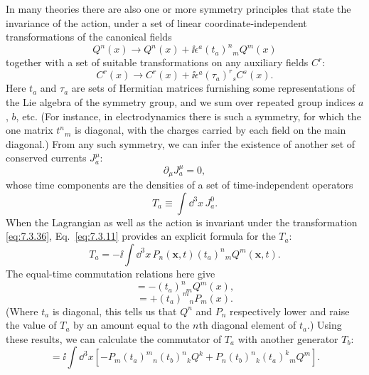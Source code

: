 In many theories there are also one or more symmetry principles that state the
invariance of the action, under a set of linear coordinate-independent
transformations of the canonical fields
\begin{equation}
Q^n(x)\longrightarrow Q^n(x)+\ii\epsilon^a(t_a)^n{}_mQ^m(x)
\tag{7.3.36}\label{eq:7.3.36}
\end{equation}
together with a set of suitable transformations on any auxiliary fields $C^r$:
\begin{equation}
C^r(x)\longrightarrow C^r(x)+\ii\epsilon^a(\tau_a)^r{}_sC^s(x).
\tag{7.3.37}\label{eq:7.3.37}
\end{equation}
Here $t_a$ and $\tau_a$ are sets of Hermitian matrices furnishing some
representations of the Lie algebra of the symmetry group, and we sum over
repeated group indices $a$, $b$, etc. (For instance, in electrodynamics there
is such a symmetry, for which the one matrix $t^n{}_m$ is diagonal, with the
charges carried by each field on the main diagonal.) From any such symmetry,
we can infer the existence of another set of conserved currents $J_a^\mu$:
\begin{equation}
\partial_\mu J_a^\mu=0,
\tag{7.3.38}\label{eq:7.3.38}
\end{equation}
whose time components are the densities of a set of time-independent operators
\begin{equation}
T_a\equiv\int \dd^3x\,J_a^0.
\tag{7.3.39}\label{eq:7.3.39}
\end{equation}
When the Lagrangian as well as the action is invariant under the transformation
\eqref{eq:7.3.36}, Eq.~\eqref{eq:7.3.11} provides an explicit formula for the $T_a$:
\begin{equation}
T_a=-\ii\int \dd^3x\,P_n(\mathbf{x},t)(t_a)^n{}_mQ^m(\mathbf{x},t).
\tag{7.3.40}\label{eq:7.3.40}
\end{equation}
The equal-time commutation relations here give
\begin{equation}
[T_a,Q^n(x)]=-(t_a)^n{}_mQ^m(x),
\tag{7.3.41}\label{eq:7.3.41}
\end{equation}
\begin{equation}
[T_a,P_n(x)]=+(t_a)^m{}_nP_m(x).
\tag{7.3.42}\label{eq:7.3.42}
\end{equation}
(Where $t_a$ is diagonal, this tells us that $Q^n$ and $P_n$ respectively
lower and raise the value of $T_a$ by an amount equal to the $n$th diagonal
element of $t_a$.) Using these results, we can calculate the commutator of
$T_a$ with another generator $T_b$:
\begin{equation}
[T_a,T_b] =\ii\int \dd^3x\left[
-P_m(t_a)^m{}_n(t_b)^n{}_kQ^k
+P_n(t_b)^n{}_k(t_a)^k{}_mQ^m\right].
\tag{7.3.43}\label{eq:7.3.43}
\end{equation}
